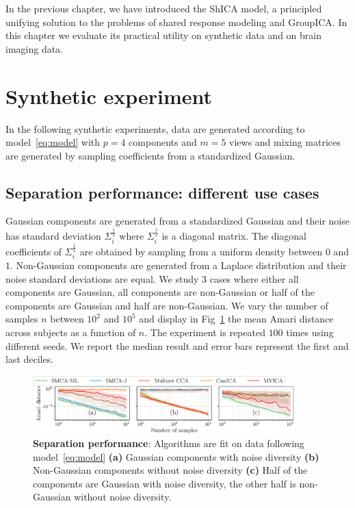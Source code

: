 In the previous chapter, we have introduced the ShICA model, a principled
unifying solution to the problems of shared response
modeling and GroupICA. In this chapter we evaluate its practical utility on
synthetic data and on brain imaging data.

\section{Synthetic experiment}
In the following synthetic experiments, data are generated according to model~\eqref{eq:model} with $p=4$ components and $m=5$ views and mixing matrices are generated by sampling coefficients from a standardized Gaussian.
\subsection{Separation performance: different use cases}
\label{sec:rotation}
Gaussian components are generated from a standardized Gaussian and their noise
has standard deviation $\Sigma_i^{\frac12}$ where $\Sigma_i^{\frac12}$ is a
diagonal matrix. The diagonal coefficients of $\Sigma_i^{\frac12}$ are obtained by sampling from a uniform density between $0$ and $1$. Non-Gaussian components are generated from a Laplace distribution and their noise standard deviations are equal. We study 3 cases where either all components are Gaussian, all components are non-Gaussian or half of the components are Gaussian and half are non-Gaussian. We vary the number of samples $n$ between $10^2$ and $10^5$ and display in Fig~\ref{exp:rotation} the mean Amari distance across subjects as a function of $n$. The experiment is repeated $100$ times using different seeds. We report the median result and error bars  represent the first and last deciles.
\begin{figure}
\centering
  \includegraphics[width=0.9\textwidth]{./figures/amvica/identifiability.pdf}
  \caption{\textbf{Separation performance}: Algorithms are fit on data following model~\ref{eq:model} \textbf{(a)} Gaussian components with noise diversity \textbf{(b)} Non-Gaussian components without noise diversity \textbf{(c)} Half of the components are Gaussian with noise diversity, the other half is non-Gaussian without noise diversity. 
  }
  \label{exp:rotation}
\end{figure}
